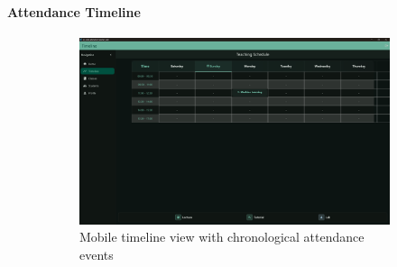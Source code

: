 \paragraph{Attendance Timeline}
\vspace{1cm}
\begin{figure}[H]
    \centering
    \begin{subfigure}[b]{0.48\textwidth}
        \includegraphics[width=\textwidth]{images/rachid/teacher-side-timeline.png}
        \caption{Mobile timeline view with chronological attendance events}
    \end{subfigure}
    \hfill
    \begin{subfigure}[b]{0.48\textwidth}

\end{subfigure}
\end{figure}
